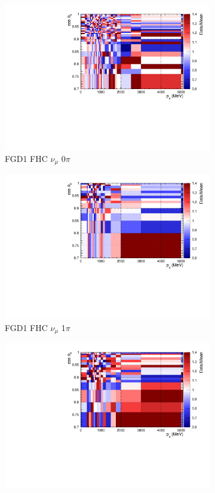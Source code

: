 \begin{figure}
\centering
\begin{subfigure}{.32\textwidth}
  \centering
  \includegraphics[width=0.85\linewidth]{figs/postpred_FGD1_numuCC_0pi.pdf}
  \caption{FGD1 FHC $\nu_{\mu}$ 0$\pi$}
  \label{fig:postpred_FGD1_numuCC_0pi}
\end{subfigure}
\begin{subfigure}{.32\textwidth}
  \centering
  \includegraphics[width=0.85\linewidth]{figs/postpred_FGD1_numuCC_1pi.pdf}
  \caption{FGD1 FHC $\nu_{\mu}$ 1$\pi$}
  \label{fig:postpred_FGD1_numuCC_1pi}
\end{subfigure}
\begin{subfigure}{.32\textwidth}
  \centering
  \includegraphics[width=0.85\linewidth]{figs/postpred_FGD1_numuCC_other.pdf}

\end{subfigure}
\end{figure}

